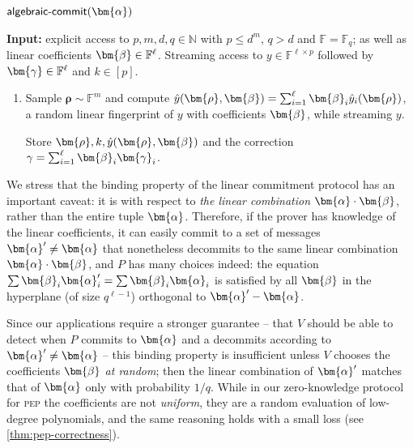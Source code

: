 \documentclass[10pt,a4paper]{article}
\newif\iflipics\lipicsfalse
\theoremstyle{definition}
\newcommand{\N}{\mathbb N}
\newcommand{\field}{\mathbb{F}}
\newcommand{\pep}{\normalfont\textsc{pep}\xspace}
\newcommand{\pcommitlength}{p}
\newcommand{\pcommitstring}{y}
\newcommand{\dimension}{m}
\newcommand{\degree}{d}
\newcommand{\fieldsize}{q}
\newcommand{\evaluationpoint}{\bm{\fe2}}
\newcommand{\fingerprinttuple}{\bm{\rho}}
\def\fe#1{
    \ifnum#1=1
        \alpha
    \else
    \ifnum#1=2
        \beta
    \else
    \ifnum#1=3
        \gamma
    \fi\fi\fi
}
\begin{document}
\iflipics
\begin{figure}
\else
\begin{protocol}[label={prot:algebraic-commit}]{$\textsf{algebraic-commit}(\bm{\fe1})$}
\fi
    \textbf{Input:} explicit access to $\pcommitlength, \dimension, \degree, \fieldsize \in \N$ with $\pcommitlength \leq \degree^\dimension$, $\fieldsize > \degree$ and $\field = \field_\fieldsize$; as well as linear coefficients $\evaluationpoint \in \field^\ell$. Streaming access to $\pcommitstring \in \field^{\ell \times \pcommitlength}$ followed by $\bm{\fe3} \in \field^\ell$ and $k \in [\pcommitlength]$.
    
	\begin{enumerate}[label={}]
	    \item[$\bm V$:] Sample $\fingerprinttuple \sim \field^\dimension$ and compute $\hat \pcommitstring(\fingerprinttuple, \evaluationpoint) = \sum_{i = 1}^\ell \evaluationpoint_i \hat \pcommitstring_i(\fingerprinttuple)$, a random linear fingerprint of $\pcommitstring$ with coefficients $\evaluationpoint$, while streaming $\pcommitstring$.
	    
	    Store $\fingerprinttuple, k, \hat \pcommitstring(\fingerprinttuple, \evaluationpoint)$ and the correction $\fe3 = \sum_{i = 1}^\ell \evaluationpoint_i \bm{\fe3}_i$.
	\end{enumerate}
\iflipics
\caption{Protocol $\textsf{algebraic-commit}(\bm{\fe1})$}
\label{prot:algebraic-commit}
\end{figure}
\else
\end{protocol}
\fi

We stress that the binding property of the linear commitment protocol has an important caveat: it is with respect to \emph{the linear combination} $\bm{\fe1} \cdot \bm{\fe2}$, rather than the entire tuple $\bm{\fe1}$. Therefore, if the prover has knowledge of the linear coefficients, it can easily commit to a set of messages $\bm{\fe1}' \neq \bm{\fe1}$ that nonetheless decommits to the same linear combination $\bm{\fe1} \cdot \evaluationpoint$, and $P$ has many choices indeed: the equation $\sum \evaluationpoint_i \bm{\fe1}_i' =  \sum \evaluationpoint_i \bm{\fe1}_i$ is satisfied by all $\evaluationpoint$ in the hyperplane (of size $\fieldsize^{\ell - 1}$) orthogonal to $\bm{\fe1}' - \bm{\fe1}$.

Since our applications require a stronger guarantee -- that $V$ should be able to detect when $P$ commits to $\bm{\fe1}$ and a decommits according to $\bm{\fe1}' \neq \bm{\fe1}$ -- this binding property is insufficient unless $V$ chooses the coefficients $\bm{\fe2}$ \emph{at random}; then the linear combination of $\bm{\fe1}'$ matches that of $\bm{\fe1}$ only with probability $1/\fieldsize$. While in our zero-knowledge protocol for \pep the coefficients are not \emph{uniform}, they are a random evaluation of low-degree polynomials, and the same reasoning holds with a small loss (see \cref{thm:pep-correctness}).
\end{document}
